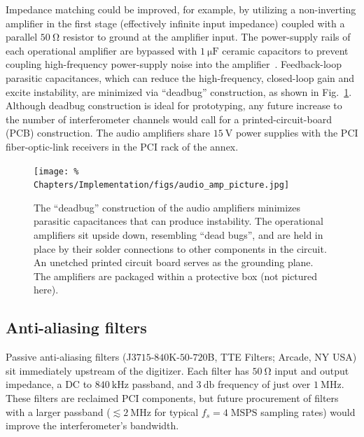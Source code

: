 Impedance matching could be improved, for example,
by utilizing a non-inverting amplifier in the first stage
(effectively infinite input impedance) coupled with
a parallel $\SI{50}{\ohm}$ resistor to ground at the amplifier input.
The power-supply rails of each operational amplifier
are bypassed with $\SI{1}{\micro\farad}$ ceramic capacitors
to prevent coupling high-frequency power-supply noise
into the amplifier~\cite[Sec.~4.2.7]{horowitz_and_hill}.
\graffito{\textcolor{red}{deadbug ref?}}
Feedback-loop parasitic capacitances,
which can reduce the high-frequency, closed-loop gain and excite instability,
are minimized via ``deadbug'' construction,
as shown in Fig.~\ref{fig:Implementation:audio_amplifier_picture}.
Although deadbug construction is ideal for prototyping,
any future increase to the number of interferometer channels
would call for a printed-circuit-board (PCB) construction.
The audio amplifiers share $\SI{15}{\volt}$ power supplies
with the PCI fiber-optic-link receivers
in the PCI rack of the \diiid\space annex.

\begin{figure}
  \centering
  \texttt{[image: \%
    Chapters/Implementation/figs/audio\_amp\_picture.jpg]}
  \caption[``Deadbug'' construction of audio amplifiers]{%
    The ``deadbug'' construction of the audio amplifiers
    minimizes parasitic capacitances that can produce instability.
    The operational amplifiers sit upside down,
    resembling ``dead bugs'', and
    are held in place by their solder connections
    to other components in the circuit.
    An unetched printed circuit board
    serves as the grounding plane.
    The amplifiers are packaged within a protective box
    (not pictured here).
  }
\label{fig:Implementation:audio_amplifier_picture}
\end{figure}


\subsection{Anti-aliasing filters}
\label{sec:Implementation:Hardware:anti_aliasing_filters}
Passive anti-aliasing filters
({J$3715$-$840$K-$50$-$720$B}, TTE Filters; Arcade, NY USA)
sit immediately upstream of the digitizer.
Each filter has $\SI{50}{\ohm}$ input and output impedance,
a DC to $\SI{840}{\kilo\hertz}$ passband, and
$\SI{3}{\decibel}$ frequency of just over $\SI{1}{\mega\hertz}$.
These filters are reclaimed PCI components, but
future procurement of filters with a larger passband
($\lesssim \SI{2}{\mega\hertz}$ for
typical $f_s = 4 \; \text{MSPS}$ sampling rates)
would improve the interferometer's bandwidth.


